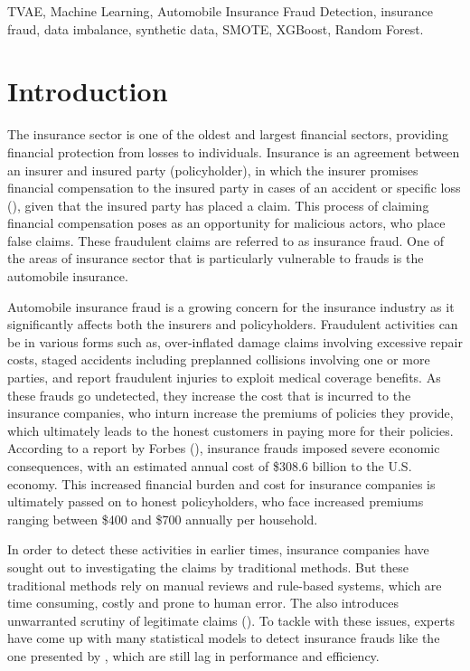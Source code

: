 \documentclass[twoside,11pt]{article}
\begin{document}
\begin{keywords}
TVAE, Machine Learning, Automobile Insurance Fraud Detection, insurance fraud, data imbalance, synthetic data, SMOTE, XGBoost, Random Forest.



\section{Introduction} 
The insurance sector is one of the oldest and largest financial sectors, providing financial protection from losses to individuals. Insurance is an agreement between an insurer and insured party (policyholder), in which the insurer promises financial compensation to the insured party in cases of an accident or specific loss (\citealp{viaeneInsuranceFraudIssues2004}), given that the insured party has placed a claim. This process of claiming financial compensation poses as an opportunity for malicious actors, who place false claims. These fraudulent claims are referred to as insurance fraud. One of the areas of insurance sector that is particularly vulnerable to frauds is the automobile insurance.

Automobile insurance fraud is a growing concern for the insurance industry as it significantly affects both the insurers and policyholders. Fraudulent activities can be in various forms such as, over-inflated damage claims involving excessive repair costs, staged accidents including preplanned collisions involving one or more parties, and report fraudulent injuries to exploit medical coverage benefits. As these frauds go undetected, they increase the cost that is incurred to the insurance companies, who inturn increase the premiums of policies they provide, which ultimately leads to the honest customers in paying more for their policies. According to a report by Forbes (\citealp{kilroyInsuranceFraudStatistics2024}), insurance frauds imposed severe economic consequences, with an estimated annual cost of \$308.6 billion to the U.S. economy. This increased financial burden and cost for insurance companies is ultimately passed on to honest policyholders, who face increased premiums ranging between \$400 and \$700 annually per household.

In order to detect these activities in earlier times, insurance companies have sought out to investigating the claims by traditional methods. But these traditional methods rely on manual reviews and rule-based systems, which are time consuming, costly and prone to human error. The also introduces unwarranted scrutiny of legitimate claims (\citealp{AndreasRp,BERMUDEZ}). To tackle with these issues, experts have come up with many statistical models to detect insurance frauds like the one presented by \citealp{belhadjiModelDetectionInsurance2000}, which are still lag in performance and efficiency. 


\end{keywords}
\end{document}
